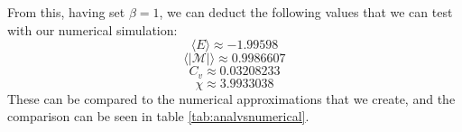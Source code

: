 \documentclass[reprint,english,notitlepage]{revtex4-1}  %
\begin{document}
\begin{appendix}
\begin{equation}
\end{equation}
From this, having set $\beta = 1$, we can deduct the following values that we can test with our numerical simulation:
\begin{equation}
    \langle E \rangle \approx -1.99598
\end{equation}
\begin{equation}
    \langle |\mathcal{M}|\rangle \approx 0.9986607
\end{equation}
\begin{equation}
    C_v \approx 0.03208233
\end{equation}
\begin{equation}
    \chi \approx 3.9933038
\end{equation}
These can be compared to the numerical approximations that we create, and the comparison can be seen in table \ref{tab:analvsnumerical}.

\onecolumngrid

\end{appendix}
\end{document}
